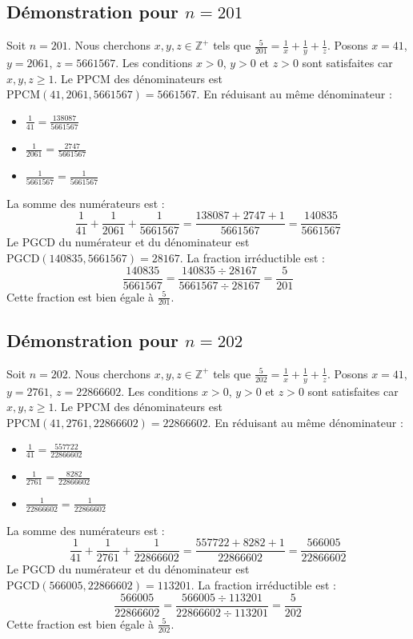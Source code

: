 \documentclass[11pt,a4paper]{article}
\begin{document}
\subsection{Démonstration pour $n = 201$}
Soit $n = 201$. Nous cherchons $x, y, z \in \mathbb{Z}^{+}$ tels que $\frac{5}{201} = \frac{1}{x} + \frac{1}{y} + \frac{1}{z}$.
Posons $x = 41$, $y = 2061$, $z = 5661567$.
Les conditions $x > 0$, $y > 0$ et $z > 0$ sont satisfaites car $x, y, z \geq 1$.
Le PPCM des dénominateurs est $\text{PPCM}(41, 2061, 5661567) = 5661567$.
En réduisant au même dénominateur :
\begin{itemize}
    \item $\frac{1}{41} = \frac{138087}{5661567}$
    \item $\frac{1}{2061} = \frac{2747}{5661567}$
    \item $\frac{1}{5661567} = \frac{1}{5661567}$
\end{itemize}
La somme des numérateurs est :
$$ \frac{1}{41} + \frac{1}{2061} + \frac{1}{5661567} = \frac{138087 + 2747 + 1}{5661567} = \frac{140835}{5661567} $$
Le PGCD du numérateur et du dénominateur est $\text{PGCD}(140835, 5661567) = 28167$.
La fraction irréductible est :
$$ \frac{140835}{5661567} = \frac{140835 \div 28167}{5661567 \div 28167} = \frac{5}{201} $$
Cette fraction est bien égale à $\frac{5}{201}$.

\subsection{Démonstration pour $n = 202$}
Soit $n = 202$. Nous cherchons $x, y, z \in \mathbb{Z}^{+}$ tels que $\frac{5}{202} = \frac{1}{x} + \frac{1}{y} + \frac{1}{z}$.
Posons $x = 41$, $y = 2761$, $z = 22866602$.
Les conditions $x > 0$, $y > 0$ et $z > 0$ sont satisfaites car $x, y, z \geq 1$.
Le PPCM des dénominateurs est $\text{PPCM}(41, 2761, 22866602) = 22866602$.
En réduisant au même dénominateur :
\begin{itemize}
    \item $\frac{1}{41} = \frac{557722}{22866602}$
    \item $\frac{1}{2761} = \frac{8282}{22866602}$
    \item $\frac{1}{22866602} = \frac{1}{22866602}$
\end{itemize}
La somme des numérateurs est :
$$ \frac{1}{41} + \frac{1}{2761} + \frac{1}{22866602} = \frac{557722 + 8282 + 1}{22866602} = \frac{566005}{22866602} $$
Le PGCD du numérateur et du dénominateur est $\text{PGCD}(566005, 22866602) = 113201$.
La fraction irréductible est :
$$ \frac{566005}{22866602} = \frac{566005 \div 113201}{22866602 \div 113201} = \frac{5}{202} $$
Cette fraction est bien égale à $\frac{5}{202}$.
\end{document}
